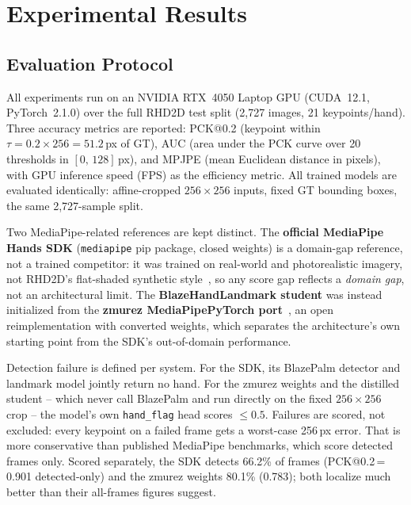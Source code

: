 \documentclass[11pt,conference,a4paper]{APSIPA2026}
\begin{document}

\section{Experimental Results}
\label{sec:results}

\subsection{Evaluation Protocol}
\label{sec:eval_protocol}

All experiments run on an NVIDIA RTX~4050 Laptop GPU (CUDA~12.1,
PyTorch~2.1.0) over the full RHD2D test split (2,727 images, 21
keypoints/hand). Three accuracy metrics are reported: PCK@0.2
(keypoint within $\tau = 0.2 \times 256 = 51.2$\,px of GT), AUC (area
under the PCK curve over 20 thresholds in $[0,\,128]$\,px), and
MPJPE (mean Euclidean distance in pixels), with GPU inference speed
(FPS) as the efficiency metric. All trained models are evaluated
identically: affine-cropped $256{\times}256$ inputs, fixed GT
bounding boxes, the same 2,727-sample split.

Two MediaPipe-related references are kept distinct. The
\textbf{official MediaPipe Hands SDK} (\texttt{mediapipe} pip
package, closed weights) is a domain-gap reference, not a trained
competitor: it was trained on real-world and photorealistic imagery,
not RHD2D's flat-shaded synthetic style~\cite{mediapipe2020}, so any
score gap reflects a \emph{domain gap}, not an architectural limit.
The \textbf{BlazeHandLandmark student} was instead initialized from
the \textbf{zmurez MediaPipePyTorch port}~\cite{mediapipepytorch2021},
an open reimplementation with converted weights, which separates the
architecture's own starting point from the SDK's out-of-domain
performance.

Detection failure is defined per system. For the SDK, its BlazePalm
detector and landmark model jointly return no hand. For the zmurez
weights and the distilled student -- which never call BlazePalm and
run directly on the fixed $256{\times}256$ crop -- the model's own
\texttt{hand\_flag} head scores $\leq0.5$. Failures are scored, not
excluded: every keypoint on a failed frame gets a worst-case
256\,px error. That is more conservative than published MediaPipe
benchmarks, which score detected frames only. Scored separately, the
SDK detects 66.2\% of frames (PCK@0.2\,=\,0.901 detected-only) and the
zmurez weights 80.1\% (0.783); both localize much better than their
all-frames figures suggest.
\end{document}
